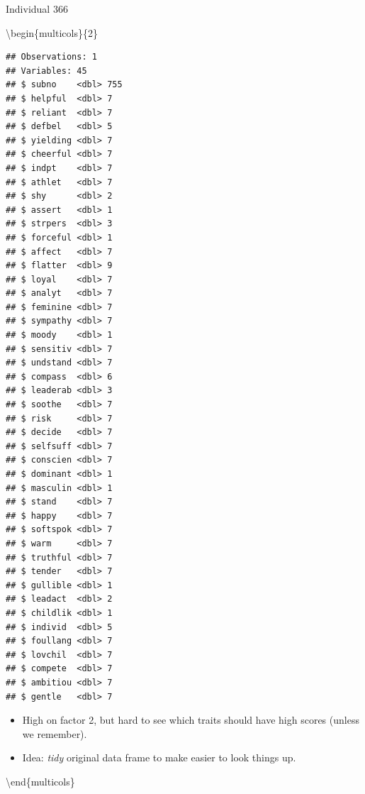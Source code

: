 \documentclass[ignorenonframetext,]{beamer}
\newenvironment{Shaded}{\begin{snugshade}}{\end{snugshade}}
\newcommand{\DecValTok}[1]{\textcolor[rgb]{0.00,0.00,0.81}{#1}}
\newcommand{\KeywordTok}[1]{\textcolor[rgb]{0.13,0.29,0.53}{\textbf{#1}}}
\newcommand{\NormalTok}[1]{#1}
\newcommand{\OperatorTok}[1]{\textcolor[rgb]{0.81,0.36,0.00}{\textbf{#1}}}
\newcommand{\StringTok}[1]{\textcolor[rgb]{0.31,0.60,0.02}{#1}}
\begin{document}
\begin{frame}[fragile]{Individual 366}
\protect\hypertarget{individual-366}{}

\textbackslash{}begin\{multicols\}\{2\}

\begin{Shaded}
\end{Shaded}

\begin{verbatim}
## Observations: 1
## Variables: 45
## $ subno    <dbl> 755
## $ helpful  <dbl> 7
## $ reliant  <dbl> 7
## $ defbel   <dbl> 5
## $ yielding <dbl> 7
## $ cheerful <dbl> 7
## $ indpt    <dbl> 7
## $ athlet   <dbl> 7
## $ shy      <dbl> 2
## $ assert   <dbl> 1
## $ strpers  <dbl> 3
## $ forceful <dbl> 1
## $ affect   <dbl> 7
## $ flatter  <dbl> 9
## $ loyal    <dbl> 7
## $ analyt   <dbl> 7
## $ feminine <dbl> 7
## $ sympathy <dbl> 7
## $ moody    <dbl> 1
## $ sensitiv <dbl> 7
## $ undstand <dbl> 7
## $ compass  <dbl> 6
## $ leaderab <dbl> 3
## $ soothe   <dbl> 7
## $ risk     <dbl> 7
## $ decide   <dbl> 7
## $ selfsuff <dbl> 7
## $ conscien <dbl> 7
## $ dominant <dbl> 1
## $ masculin <dbl> 1
## $ stand    <dbl> 7
## $ happy    <dbl> 7
## $ softspok <dbl> 7
## $ warm     <dbl> 7
## $ truthful <dbl> 7
## $ tender   <dbl> 7
## $ gullible <dbl> 1
## $ leadact  <dbl> 2
## $ childlik <dbl> 1
## $ individ  <dbl> 5
## $ foullang <dbl> 7
## $ lovchil  <dbl> 7
## $ compete  <dbl> 7
## $ ambitiou <dbl> 7
## $ gentle   <dbl> 7
\end{verbatim}

\begin{itemize}
\item
  High on factor 2, but hard to see which traits should have high scores
  (unless we remember).
\item
  Idea: \emph{tidy} original data frame to make easier to look things
  up.
\end{itemize}

\textbackslash{}end\{multicols\}

\end{frame}
\end{document}
